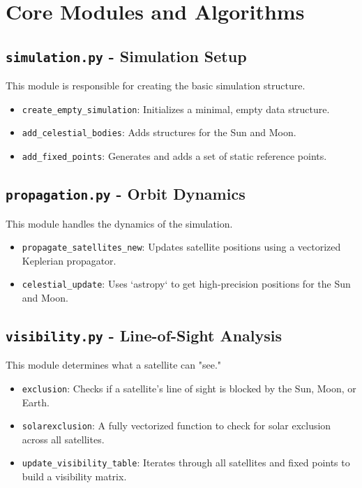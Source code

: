 \documentclass[11pt]{article}
\begin{document}
\section{Core Modules and Algorithms}

\subsection{\texttt{simulation.py} - Simulation Setup}
This module is responsible for creating the basic simulation structure.
\begin{itemize}
    \item \texttt{create\_empty\_simulation}: Initializes a minimal, empty data structure.
    \item \texttt{add\_celestial\_bodies}: Adds structures for the Sun and Moon.
    \item \texttt{add\_fixed\_points}: Generates and adds a set of static reference points.
\end{itemize}

\subsection{\texttt{propagation.py} - Orbit Dynamics}
This module handles the dynamics of the simulation.
\begin{itemize}
    \item \texttt{propagate\_satellites\_new}: Updates satellite positions using a vectorized Keplerian propagator.
    \item \texttt{celestial\_update}: Uses `astropy` to get high-precision positions for the Sun and Moon.
\end{itemize}

\subsection{\texttt{visibility.py} - Line-of-Sight Analysis}
This module determines what a satellite can "see."
\begin{itemize}
    \item \texttt{exclusion}: Checks if a satellite's line of sight is blocked by the Sun, Moon, or Earth.
    \item \texttt{solarexclusion}: A fully vectorized function to check for solar exclusion across all satellites.
    \item \texttt{update\_visibility\_table}: Iterates through all satellites and fixed points to build a visibility matrix.
\end{itemize}
\end{document}
